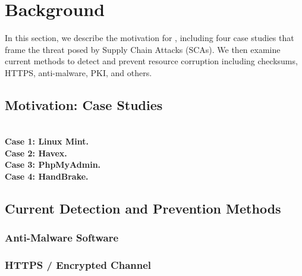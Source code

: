 \section{Background} \label{sec:background}

In this section, we describe the motivation for \SYSTEM{}, including four case
studies that frame the threat posed by Supply Chain Attacks (SCAs). We then
examine current methods to detect and prevent resource corruption including
checksums, HTTPS, anti-malware, PKI, and others.

\subsection{Motivation: Case Studies}

 \\

\noindent\textbf{Case 1: Linux Mint.}  \\

\noindent\textbf{Case 2: Havex.}  \\

\noindent\textbf{Case 3: PhpMyAdmin.}  \\

\noindent\textbf{Case 4: HandBrake.}  \\

\subsection{Current Detection and Prevention Methods}


\subsubsection{Anti-Malware Software}


\subsubsection{HTTPS / Encrypted Channel}

~\cite{HTTP, HTTPS, TLS1, TLS1.2, TLS0, DTLS}

